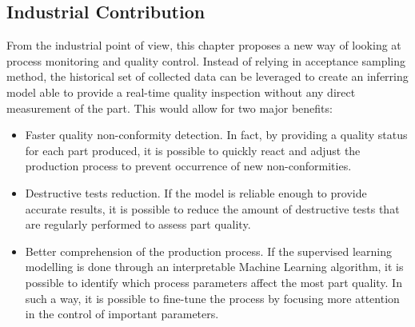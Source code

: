 \subsection{Industrial Contribution}

From the industrial point of view, this chapter proposes a new way of looking at process monitoring and quality control. Instead of relying in acceptance sampling method, the historical set of collected data can be leveraged to create an inferring model able to provide a real-time quality inspection without any direct measurement of the part. This would allow for two major benefits:

\begin{itemize}
    \item Faster quality non-conformity detection. In fact, by providing a quality status for each part produced, it is possible to quickly react and adjust the production process to prevent occurrence of new non-conformities.
    \item Destructive tests reduction. If the model is reliable enough to provide accurate results, it is possible to reduce the amount of destructive tests that are regularly performed to assess part quality.
    \item Better comprehension of the production process. If the supervised learning modelling is done through an interpretable Machine Learning algorithm, it is possible to identify which process parameters affect the most part quality. In such a way, it is possible to fine-tune the process by focusing more attention in the control of important parameters. 
\end{itemize}